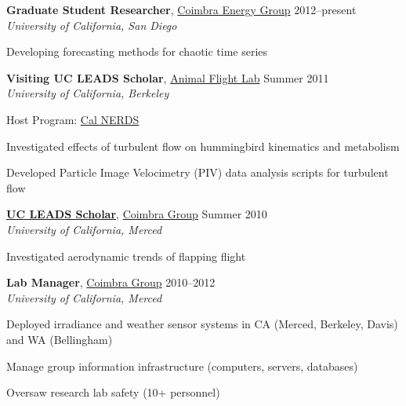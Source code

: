 \documentclass[10pt]{article}
\newcommand{\blankline}{\quad\pagebreak[3]}
\begin{document}
\blankline


\textbf{Graduate Student Researcher}, \href{http://coimbra.ucsd.edu/}{Coimbra Energy Group} \hfill 2012--present \\
\textit{University of California, San Diego}
\begin{innerlist}
    \item Developing forecasting methods for chaotic time series
\end{innerlist}


\blankline


\textbf{Visiting UC LEADS Scholar}, \href{http://ib.berkeley.edu/labs/dudley}{Animal Flight Lab} \hfill Summer 2011 \\
\textit{University of California, Berkeley}
\begin{innerlist}
    \item Host Program: \href{http://ucberkeleynerds.com/}{Cal NERDS}
    \item Investigated effects of turbulent flow on hummingbird kinematics and metabolism
    \item Developed Particle Image Velocimetry (PIV) data analysis scripts for turbulent flow
\end{innerlist}


\blankline


\textbf{\href{http://graduatedivision.ucmerced.edu/grad-prep-programs/uc-leads}{UC LEADS Scholar}}, \href{http://coimbra.ucsd.edu/}{Coimbra Group} \hfill Summer 2010 \\
\textit{University of California, Merced}
\begin{innerlist}
    \item Investigated aerodynamic trends of flapping flight
\end{innerlist}


\blankline


\textbf{Lab Manager}, \href{http://coimbra.ucsd.edu/}{Coimbra Group} \hfill 2010--2012 \\
\textit{University of California, Merced}
\begin{innerlist}
    \item Deployed irradiance and weather sensor systems in CA (Merced, Berkeley, Davis) and WA (Bellingham)
    \item Manage group information infrastructure (computers, servers, databases)
    \item Oversaw research lab safety (10+ personnel)
\end{innerlist}
\end{document}
